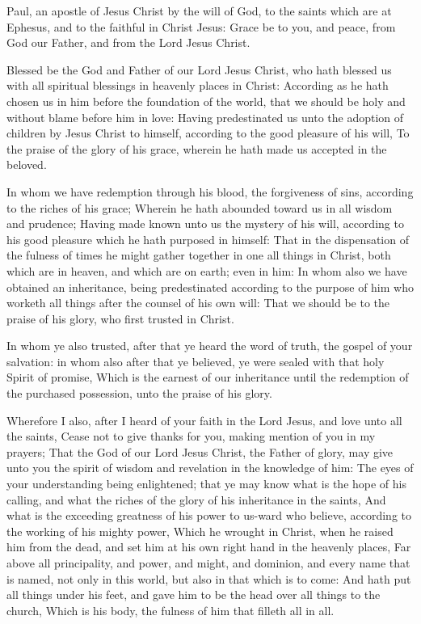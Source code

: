 \Chapter
\Verse Paul, an apostle of Jesus Christ by the will of God, to the saints which are at Ephesus, and to the faithful in Christ Jesus: \Verse Grace be to you, and peace, from God our Father, and from the Lord Jesus Christ.

\Verse Blessed be the God and Father of our Lord Jesus Christ, who hath blessed us with all spiritual blessings in heavenly places in Christ: \Verse According as he hath chosen us in him before the foundation of the world, that we should be holy and without blame before him in love: \Verse Having predestinated us unto the adoption of children by Jesus Christ to himself, according to the good pleasure of his will, \Verse To the praise of the glory of his grace, wherein he hath made us accepted in the beloved.

\Verse In whom we have redemption through his blood, the forgiveness of sins, according to the riches of his grace; \Verse Wherein he hath abounded toward us in all wisdom and prudence; \Verse Having made known unto us the mystery of his will, according to his good pleasure which he hath purposed in himself: \Verse That in the dispensation of the fulness of times he might gather together in one all things in Christ, both which are in heaven, and which are on earth; even in him: \Verse In whom also we have obtained an inheritance, being predestinated according to the purpose of him who worketh all things after the counsel of his own will: \Verse That we should be to the praise of his glory, who first trusted in Christ.

\Verse In whom ye also trusted, after that ye heard the word of truth, the gospel of your salvation: in whom also after that ye believed, ye were sealed with that holy Spirit of promise, \Verse Which is the earnest of our inheritance until the redemption of the purchased possession, unto the praise of his glory.

\Verse Wherefore I also, after I heard of your faith in the Lord Jesus, and love unto all the saints, \Verse Cease not to give thanks for you, making mention of you in my prayers; \Verse That the God of our Lord Jesus Christ, the Father of glory, may give unto you the spirit of wisdom and revelation in the knowledge of him: \Verse The eyes of your understanding being enlightened; that ye may know what is the hope of his calling, and what the riches of the glory of his inheritance in the saints, \Verse And what is the exceeding greatness of his power to us-ward who believe, according to the working of his mighty power, \Verse Which he wrought in Christ, when he raised him from the dead, and set him at his own right hand in the heavenly places, \Verse Far above all principality, and power, and might, and dominion, and every name that is named, not only in this world, but also in that which is to come: \Verse And hath put all things under his feet, and gave him to be the head over all things to the church, \Verse Which is his body, the fulness of him that filleth all in all.


